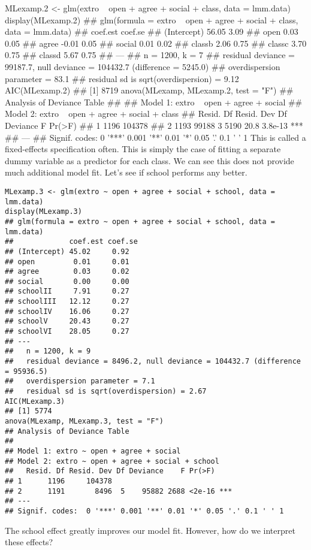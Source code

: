 MLexamp.2 <- glm(extro ~ open + agree + social + class, data = lmm.data)
display(MLexamp.2)
## glm(formula = extro ~ open + agree + social + class, data = lmm.data)
##             coef.est coef.se
## (Intercept) 56.05     3.09  
## open         0.03     0.05  
## agree       -0.01     0.05  
## social       0.01     0.02  
## classb       2.06     0.75  
## classc       3.70     0.75  
## classd       5.67     0.75  
## ---
##   n = 1200, k = 7
##   residual deviance = 99187.7, null deviance = 104432.7 (difference = 5245.0)
##   overdispersion parameter = 83.1
##   residual sd is sqrt(overdispersion) = 9.12
AIC(MLexamp.2)
## [1] 8719
anova(MLexamp, MLexamp.2, test = "F")
## Analysis of Deviance Table
## 
## Model 1: extro ~ open + agree + social
## Model 2: extro ~ open + agree + social + class
##   Resid. Df Resid. Dev Df Deviance    F  Pr(>F)    
## 1      1196     104378                             
## 2      1193      99188  3     5190 20.8 3.8e-13 ***
## ---
## Signif. codes:  0 '***' 0.001 '**' 0.01 '*' 0.05 '.' 0.1 ' ' 1
This is called a fixed-effects specification often. This is simply the case of fitting a separate dummy variable as a predictor for each class. We can see this does not provide much additional model fit. Let's see if school performs any better.
\begin{framed}
\begin{verbatim}
MLexamp.3 <- glm(extro ~ open + agree + social + school, data = lmm.data)
display(MLexamp.3)
## glm(formula = extro ~ open + agree + social + school, data = lmm.data)
##             coef.est coef.se
## (Intercept) 45.02     0.92  
## open         0.01     0.01  
## agree        0.03     0.02  
## social       0.00     0.00  
## schoolII     7.91     0.27  
## schoolIII   12.12     0.27  
## schoolIV    16.06     0.27  
## schoolV     20.43     0.27  
## schoolVI    28.05     0.27  
## ---
##   n = 1200, k = 9
##   residual deviance = 8496.2, null deviance = 104432.7 (difference = 95936.5)
##   overdispersion parameter = 7.1
##   residual sd is sqrt(overdispersion) = 2.67
AIC(MLexamp.3)
## [1] 5774
anova(MLexamp, MLexamp.3, test = "F")
## Analysis of Deviance Table
## 
## Model 1: extro ~ open + agree + social
## Model 2: extro ~ open + agree + social + school
##   Resid. Df Resid. Dev Df Deviance    F Pr(>F)    
## 1      1196     104378                            
## 2      1191       8496  5    95882 2688 <2e-16 ***
## ---
## Signif. codes:  0 '***' 0.001 '**' 0.01 '*' 0.05 '.' 0.1 ' ' 1
\end{verbatim}
\end{framed}
The school effect greatly improves our model fit. However, how do we interpret these effects?


